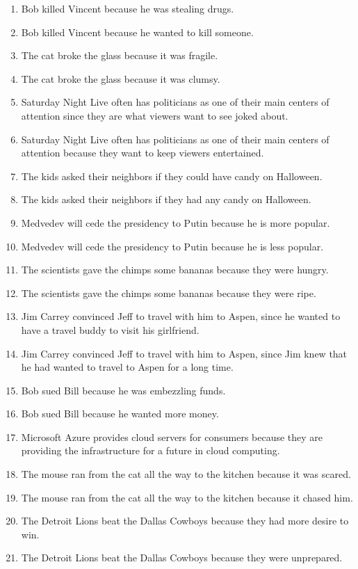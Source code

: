 \documentclass{article}
\begin{document}
\begin{enumerate}
	\item Bob killed Vincent because he was stealing drugs.
	\item Bob killed Vincent because he wanted to kill someone.
	\item The cat broke the glass because it was fragile.
	\item The cat broke the glass because it was clumsy.
	\item Saturday Night Live often has politicians as one of their main centers of attention since they are what viewers want to see joked about.
	\item Saturday Night Live often has politicians as one of their main centers of attention because they want to keep viewers entertained.
	\item The kids asked their neighbors if they could have candy on Halloween.
	\item The kids asked their neighbors if they had any candy on Halloween.
	\item Medvedev will cede the presidency to Putin because he is more popular.
	\item Medvedev will cede the presidency to Putin because he is less popular.
	\item The scientists gave the chimps some bananas because they were hungry.
	\item The scientists gave the chimps some bananas because they were ripe.
	\item Jim Carrey convinced Jeff to travel with him to Aspen, since he wanted to have a travel buddy to visit his girlfriend.
	\item Jim Carrey convinced Jeff to travel with him to Aspen, since Jim knew that he had wanted to travel to Aspen for a long time.
	\item Bob sued Bill because he was embezzling funds.
	\item Bob sued Bill because he wanted more money.
	\item Microsoft Azure provides cloud servers for consumers because they are providing the infrastructure for a future in cloud computing.
	\item The mouse ran from the cat all the way to the kitchen because it was scared.
	\item The mouse ran from the cat all the way to the kitchen because it chased him.
	\item The Detroit Lions beat the Dallas Cowboys because they had more desire to win.
	\item The Detroit Lions beat the Dallas Cowboys because they were unprepared.

\end{enumerate}
\end{document}
